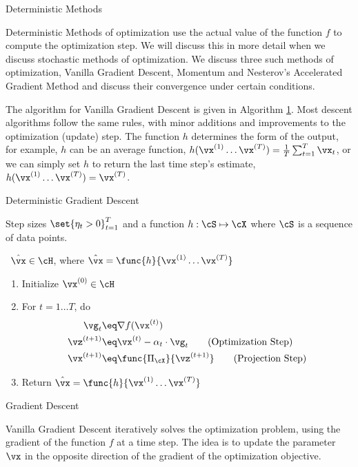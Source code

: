 \documentclass{article}
\newcommand{\x}[1]{\vx^{(#1)}}
\newcommand{\z}[1]{\vz^{(#1)}}
\newcommand{\gf}[1]{\nabla f(\vx^{(#1)})}
\begin{document}
\begin{psection}{Deterministic Methods}

	Deterministic Methods of optimization use the actual value of the function $f$ to compute the optimization step. We will discuss this in more detail when we discuss stochastic methods of optimization. We discuss three such methods of optimization, Vanilla Gradient Descent, Momentum and Nesterov's Accelerated Gradient Method and discuss their convergence under certain conditions.

	The algorithm for Vanilla Gradient Descent is given in Algorithm \hyperlink{algo:1}{1}. Most descent algorithms follow the same rules, with minor additions and improvements to the optimization (update) step. The function $h$ determines the form of the output, for example, $h$ can be an average function, \ie $h(\x{1} \dots \x{T}) = \frac{1}{T} \sum_{t = 1}^T \vx_t$, or we can simply set $h$ to return the last time step's estimate, \ie $h(\x{1} \dots \x{T}) = \x{T}$.

	\begin{algo}[0.9\textwidth]{Deterministic Gradient Descent}

		 \quad Step sizes $\set{\eta_t > 0}_{t = 1}^T$ and a function $h : \cS \mapsto \cX $ where $\cS$ is a sequence of data points. \sbr

		\, $\hat{\vx} \in \cH$, where $\hat{\vx} = \func{h}{\vx^{(1)} \dots \vx^{(T)}}$ \sbr


		\begin{enumerate}
			\item Initialize $\x{0} \in \cH$
			\item For $t = 1 \dots T$, do
				\begin{align}
					\vg_t		&\eq	\gf{t}							\nonumber				\\
					\z{t + 1}	&\eq	\x{t} - \alpha_t \cdot \vg_t	\tag{Optimization Step}	\\
					\x{t + 1}	&\eq	\func{\Pi_{\cX}}{\z{t + 1}}		\tag{Projection Step}
				\end{align}
			\item Return $\hat{\vx} = \func{h}{\x{1} \dots \x{T}}$
		\end{enumerate}

	\end{algo}

	\begin{psubsection}{Gradient Descent}

		Vanilla Gradient Descent iteratively solves the optimization problem, using the gradient of the function $f$ at a time step. The idea is to update the parameter $\vx$ in the opposite direction of the gradient of the optimization objective.


\end{psubsection}
\end{psection}
\end{document}
